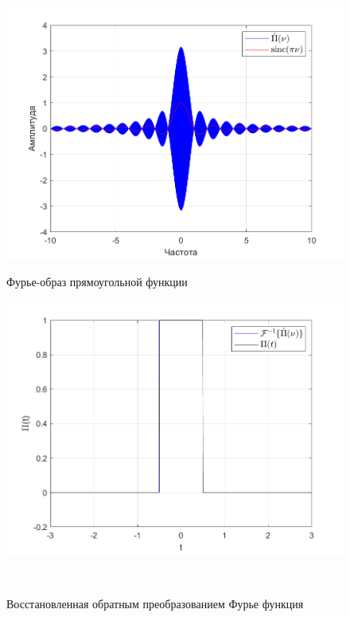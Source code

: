 \documentclass[a4paper]{article}
\begin{document}
\begin{figure}[H]
    \begin{minipage}{0.5\textwidth}
        \centering \includegraphics[width=\textwidth]{graphs/2/T_100_dt_0.001_V_1000_dv_0.01/fourier_numerical.png}
        \caption{Фурье-образ прямоугольной функции}
    \end{minipage}\hfill
    \begin{minipage}{0.5\textwidth}
        \centering \includegraphics[width=\textwidth]{graphs/2/T_100_dt_0.001_V_1000_dv_0.01/func_inversed_fourier.png}
        \caption{Восстановленная обратным преобразованием Фурье функция}
    \end{minipage}\\[1em]
\end{figure}\noindent\
\end{document}
